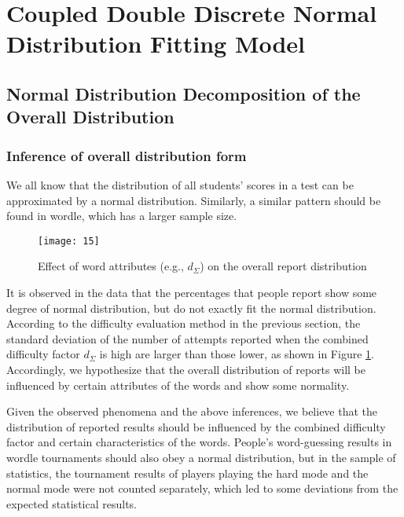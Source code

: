 \documentclass[12pt]{mcmthesis}
\begin{document}
\section{Coupled Double Discrete Normal Distribution Fitting Model}
\subsection{Normal Distribution Decomposition of the Overall Distribution}
\subsubsection{Inference of overall distribution form}
\hspace{1.4em}We all know that the distribution of all students' scores in a test can be approximated by a normal distribution. Similarly, a similar pattern should be found in wordle, which has a larger sample size.

\begin{figure}[h]
	\small
	\centering
	\texttt{[image: 15]}
	\caption{Effect of word attributes (e.g., $ d_{\varSigma } $) on the overall report distribution} 
	\label{fig:6}
\end{figure}
It is observed in the data that the percentages that people report show some degree of normal distribution, but do not exactly fit the normal distribution. According to the difficulty evaluation method in the previous section, the standard deviation of the number of attempts reported when the combined difficulty factor $ d_{\varSigma } $ is high are larger than those lower, as shown in Figure \ref{fig:6}. Accordingly, we hypothesize that the overall distribution of reports will be influenced by certain attributes of the words and show some normality.

Given the observed phenomena and the above inferences, we believe that the distribution of reported results should be influenced by the combined difficulty factor and certain characteristics of the words. People's word-guessing results in wordle tournaments should also obey a normal distribution, but in the sample of statistics, the tournament results of players playing the hard mode and the normal mode were not counted separately, which led to some deviations from the expected statistical results.
\end{document}

